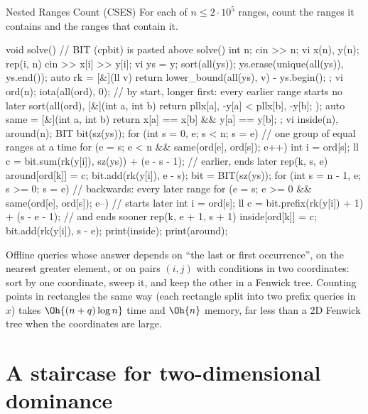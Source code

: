 \begin{problem}{Nested Ranges Count (CSES)}
For each of $n \le 2 \cdot 10^5$ ranges, count the ranges it contains and the ranges that contain it.
\end{problem}

\begin{code}
void solve() {  // BIT (cpbit) is pasted above solve()
    int n;
    cin >> n;
    vi x(n), y(n);
    rep(i, n) cin >> x[i] >> y[i];
    vi ys = y;
    sort(all(ys));
    ys.erase(unique(all(ys)), ys.end());
    auto rk = [&](ll v) { return lower_bound(all(ys), v) - ys.begin(); };
    vi ord(n);
    iota(all(ord), 0);
    // by start, longer first: every earlier range starts no later
    sort(all(ord), [&](int a, int b) {
        return pll{x[a], -y[a]} < pll{x[b], -y[b]};
    });
    auto same = [&](int a, int b) { return x[a] == x[b] && y[a] == y[b]; };
    vi inside(n), around(n);
    BIT bit(sz(ys));
    for (int s = 0, e; s < n; s = e) {  // one group of equal ranges at a time
        for (e = s; e < n && same(ord[e], ord[s]); e++) {}
        int i = ord[s];
        ll c = bit.sum(rk(y[i]), sz(ys)) + (e - s - 1);  // earlier, ends later
        rep(k, s, e) around[ord[k]] = c;
        bit.add(rk(y[i]), e - s);
    }
    bit = BIT(sz(ys));
    for (int s = n - 1, e; s >= 0; s = e) {  // backwards: every later range
        for (e = s; e >= 0 && same(ord[e], ord[s]); e--) {}  // starts later
        int i = ord[s];
        ll c = bit.prefix(rk(y[i]) + 1) + (s - e - 1);  // and ends sooner
        rep(k, e + 1, s + 1) inside[ord[k]] = c;
        bit.add(rk(y[i]), s - e);
    }
    print(inside);
    print(around);
}
\end{code}

\begin{recognize}
Offline queries whose answer depends on ``the last or first occurrence'', on the nearest greater element, or on pairs $(i, j)$ with
conditions in two coordinates: sort by one coordinate, sweep it, and keep the other in a Fenwick tree. Counting points in rectangles
the same way (each rectangle split into two prefix queries in $x$) takes $\Oh{(n + q) \log n}$ time and $\Oh{n}$ memory, far less than
a 2D Fenwick tree when the coordinates are large.
\end{recognize}

\section[A staircase for dominance]{A staircase for two-dimensional dominance \hfill \ioi}\label{sec:staircase}

